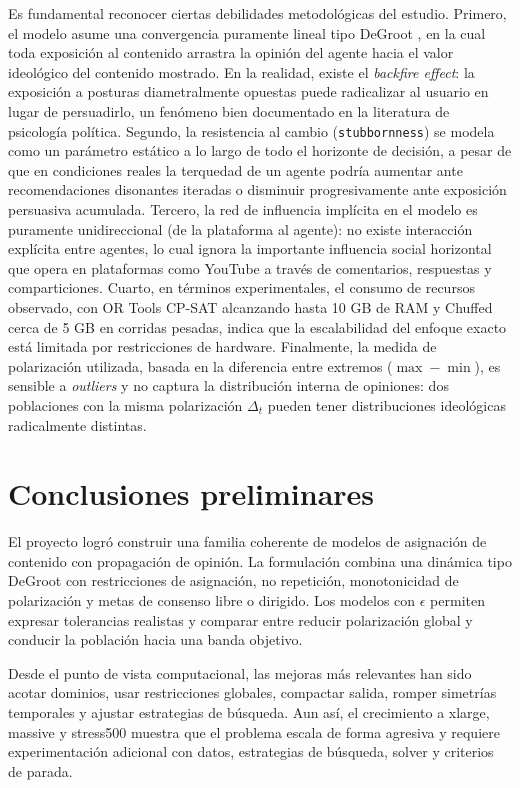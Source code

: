 \documentclass[10pt,letterpaper]{article}
\begin{document}
Es fundamental reconocer ciertas debilidades metodol\'ogicas del estudio. Primero, el modelo asume una convergencia puramente lineal tipo DeGroot \cite{degroot1974}, en la cual toda exposici\'on al contenido arrastra la opini\'on del agente hacia el valor ideol\'ogico del contenido mostrado. En la realidad, existe el \textit{backfire effect}: la exposici\'on a posturas diametralmente opuestas puede radicalizar al usuario en lugar de persuadirlo, un fen\'omeno bien documentado en la literatura de psicolog\'ia pol\'itica. Segundo, la resistencia al cambio (\texttt{stubbornness}) se modela como un par\'ametro est\'atico a lo largo de todo el horizonte de decisi\'on, a pesar de que en condiciones reales la terquedad de un agente podr\'ia aumentar ante recomendaciones disonantes iteradas o disminuir progresivamente ante exposici\'on persuasiva acumulada. Tercero, la red de influencia impl\'icita en el modelo es puramente unidireccional (de la plataforma al agente): no existe interacci\'on expl\'icita entre agentes, lo cual ignora la importante influencia social horizontal que opera en plataformas como YouTube a trav\'es de comentarios, respuestas y comparticiones. Cuarto, en t\'erminos experimentales, el consumo de recursos observado, con OR Tools CP-SAT alcanzando hasta 10 GB de RAM y Chuffed cerca de 5 GB en corridas pesadas, indica que la escalabilidad del enfoque exacto est\'a limitada por restricciones de hardware. Finalmente, la medida de polarizaci\'on utilizada, basada en la diferencia entre extremos (\(\max - \min\)), es sensible a \textit{outliers} y no captura la distribuci\'on interna de opiniones: dos poblaciones con la misma polarizaci\'on \(\Delta_t\) pueden tener distribuciones ideol\'ogicas radicalmente distintas.

\section{Conclusiones preliminares}

El proyecto logr\'o construir una familia coherente de modelos de asignaci\'on de contenido con propagaci\'on de opini\'on. La formulaci\'on combina una din\'amica tipo DeGroot con restricciones de asignaci\'on, no repetici\'on, monotonicidad de polarizaci\'on y metas de consenso libre o dirigido. Los modelos con \(\epsilon\) permiten expresar tolerancias realistas y comparar entre reducir polarizaci\'on global y conducir la poblaci\'on hacia una banda objetivo.

Desde el punto de vista computacional, las mejoras m\'as relevantes han sido acotar dominios, usar restricciones globales, compactar salida, romper simetr\'ias temporales y ajustar estrategias de b\'usqueda. Aun as\'i, el crecimiento a xlarge, massive y stress500 muestra que el problema escala de forma agresiva y requiere experimentaci\'on adicional con datos, estrategias de b\'usqueda, solver y criterios de parada.
\end{document}
